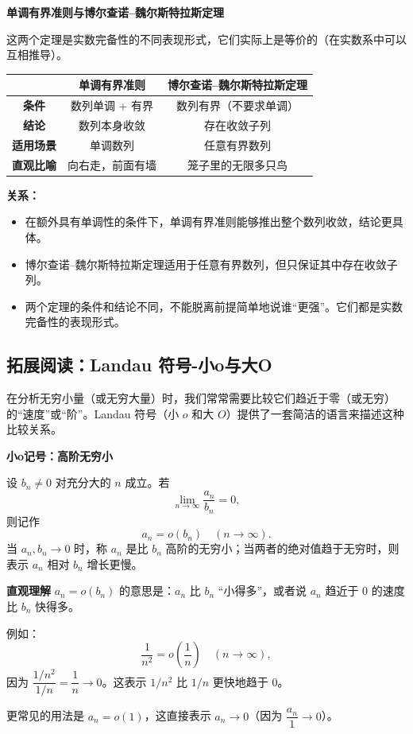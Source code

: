 \documentclass[fontset=fandol]{ctexart}
\newenvironment{custom}[1]{\par\noindent\textbf{#1}\quad}{\par\vspace{0.8em}}
\newenvironment{intuition}{\par\noindent\textbf{直观理解}\quad}{\par\vspace{0.8em}}
\begin{document}
\begin{custom}{单调有界准则与博尔查诺--魏尔斯特拉斯定理}

这两个定理是实数完备性的不同表现形式，它们实际上是等价的（在实数系中可以互相推导）。

\begin{tabular}{|c|c|c|}
\hline
 & \textbf{单调有界准则} & \textbf{博尔查诺--魏尔斯特拉斯定理} \\
\hline
\textbf{条件} & 数列单调 + 有界 & 数列有界（不要求单调） \\
\hline
\textbf{结论} & 数列本身收敛 & 存在收敛子列 \\
\hline
\textbf{适用场景} & 单调数列 & 任意有界数列 \\
\hline
\textbf{直观比喻} & 向右走，前面有墙 & 笼子里的无限多只鸟 \\
\hline
\end{tabular}

\textbf{关系：}
\begin{itemize}
\item 在额外具有单调性的条件下，单调有界准则能够推出整个数列收敛，结论更具体。
\item 博尔查诺--魏尔斯特拉斯定理适用于任意有界数列，但只保证其中存在收敛子列。
\item 两个定理的条件和结论不同，不能脱离前提简单地说谁“更强”。它们都是实数完备性的表现形式。
\end{itemize}

\end{custom}
\fi


\iffalse
\subsection*{拓展阅读：Landau 符号-小o与大O}

在分析无穷小量（或无穷大量）时，我们常常需要比较它们趋近于零（或无穷）的“速度”或“阶”。Landau 符号（小 \(o\) 和大 \(O\)）提供了一套简洁的语言来描述这种比较关系。

\textbf{小o记号：高阶无穷小}

\begin{definition}[小o记号]
设 \(b_n\neq0\) 对充分大的 \(n\) 成立。若
\[
\lim_{n\to\infty}\dfrac{a_n}{b_n}=0,
\]
则记作
\[
a_n = o(b_n) \quad (n \to \infty).
\]
当 \(a_n,b_n\to0\) 时，称 \(a_n\) 是比 \(b_n\) 高阶的无穷小；当两者的绝对值趋于无穷时，则表示 \(a_n\) 相对 \(b_n\) 增长更慢。
\end{definition}

\begin{intuition}
\(a_n = o(b_n)\) 的意思是：\(a_n\) 比 \(b_n\) “小得多”，或者说 \(a_n\) 趋近于 0 的速度比 \(b_n\) 快得多。

例如：
\[
\dfrac{1}{n^2} = o\left(\dfrac{1}{n}\right) \quad (n \to \infty),
\]
因为 \(\dfrac{1/n^2}{1/n} = \dfrac{1}{n} \to 0\)。这表示 \(1/n^2\) 比 \(1/n\) 更快地趋于 0。

更常见的用法是 \(a_n = o(1)\)，这直接表示 \(a_n \to 0\)（因为 \(\dfrac{a_n}{1} \to 0\)）。
\end{intuition}
\end{document}
